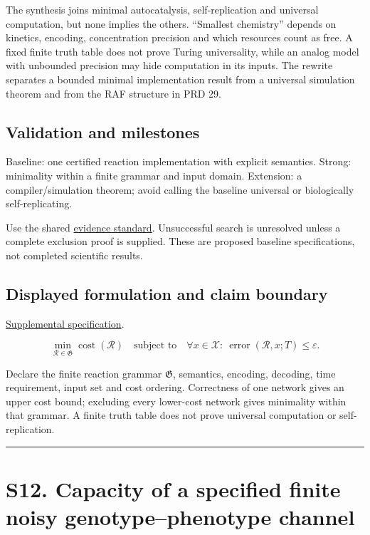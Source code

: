 \documentclass[
  11pt,
]{article}
\newcounter{none} %
\begin{document}
The synthesis joins minimal autocatalysis, self-replication and
universal computation, but none implies the others. ``Smallest
chemistry'' depends on kinetics, encoding, concentration precision and
which resources count as free. A fixed finite truth table does not prove
Turing universality, while an analog model with unbounded precision may
hide computation in its inputs. The rewrite separates a bounded minimal
implementation result from a universal simulation theorem and from the
RAF structure in PRD 29.

\subsection{Validation and milestones}

Baseline: one certified reaction implementation with explicit semantics.
Strong: minimality within a finite grammar and input domain. Extension:
a compiler/simulation theorem; avoid calling the baseline universal or
biologically self-replicating.

Use the shared
\href{https://github.com/rick-stevens-ai/Pure-Thought/blob/main/reviews/EVIDENCE-STANDARD.md}{evidence
standard}. Unsuccessful search is unresolved unless a complete exclusion
proof is supplied. These are proposed baseline specifications, not
completed scientific results.

\subsection{Displayed formulation and claim boundary}

\href{https://github.com/rick-stevens-ai/Pure-Thought/blob/main/supplemental/S11.md}{Supplemental
specification}.

\[\min_{\mathcal R\in\mathfrak G}\operatorname{cost}(\mathcal R)
\quad\text{subject to}\quad
\forall x\in\mathcal X:\ \operatorname{error}(\mathcal R,x;T)\le\varepsilon.\]

Declare the finite reaction grammar \(\mathfrak G\), semantics,
encoding, decoding, time requirement, input set and cost ordering.
Correctness of one network gives an upper cost bound; excluding every
lower-cost network gives minimality within that grammar. A finite truth
table does not prove universal computation or self-replication.

\begin{center}\rule{0.5\linewidth}{0.5pt}\end{center}

\section{S12. Capacity of a specified finite noisy genotype--phenotype
channel}
\end{document}
